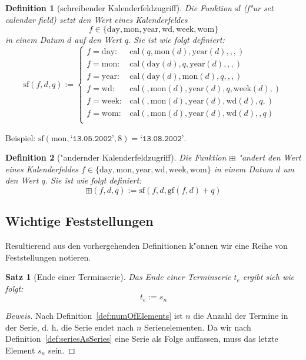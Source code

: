 \documentclass[a4paper]{article}
\newcommand*{\dayf}{\mathrm{day}}
\newcommand*{\monf}{\mathrm{mon}}
\newcommand*{\yearf}{\mathrm{year}}
\newcommand*{\wdf}{\mathrm{wd}}
\newcommand*{\weekf}{\mathrm{week}}
\newcommand*{\womf}{\mathrm{wom}}
\newcommand*{\calf}{\mathrm{cal}}
\newcommand*{\datev}[1]{\texttt{`#1'}}
\newcommand*{\gff}{\mathrm{gf}}
\newcommand*{\sff}{\mathrm{sf}}
\newcommand*{\addff}{\boxplus}
\numberwithin{equation}{section}
\newtheorem{dfn}{Definition}
\newtheorem{thm}{Satz}
\begin{document}
\begin{dfn}[schreibender Kalenderfeldzugriff]
  Die Funktion $\sff$ (f"ur \emph{set calendar field}) setzt den Wert eines
  Kalenderfeldes
  \begin{equation*}
    f \in \{\dayf, \monf, \yearf, \wdf, \weekf, \womf\}
  \end{equation*}
  in einem Datum $d$ auf den Wert $q$. Sie ist wie folgt definiert:
  \begin{equation}
    \sff(f, d, q) := \left\{\begin{array}{ll}
    f = \dayf : & \calf(q, \monf(d), \yearf(d), , , ) \\
    f = \monf : & \calf(\dayf(d), q, \yearf(d), , , ) \\
    f = \yearf : & \calf(\dayf(d), \monf(d), q, , ,) \\
    f = \wdf : & \calf(, \monf(d), \yearf(d), q, \weekf(d), ) \\
    f = \weekf : & \calf(, \monf(d), \yearf(d), \wdf(d), q, ) \\
    f = \womf : & \calf(, \monf(d), \yearf(d), \wdf(d), , q) \\
    \end{array}\right.
  \end{equation}
\end{dfn}
\noindent Beispiel: $\sff(\monf, \datev{13.05.2002}, 8) = \datev{13.08.2002}$.

\begin{dfn}["andernder Kalenderfeldzugriff]
  Die Funktion $\addff$ "andert den Wert eines Kalenderfeldes $f \in \{\dayf,
  \monf, \yearf, \wdf, \weekf, \womf\}$ in einem Datum $d$ um den Wert $q$. Sie
  ist wie folgt definiert:
  \begin{equation}
    \addff(f, d, q) := \sff(f, d, \gff(f, d) + q)
  \end{equation}
\end{dfn}


%
%
\subsection{Wichtige Feststellungen}
Resultierend aus den vorhergehenden Definitionen k"onnen wir eine Reihe von
Feststellungen notieren.

\begin{thm}[Ende einer Terminserie]\label{thm:endOfSeries}
  Das Ende einer Terminserie $t_e$ ergibt sich wie folgt:
  \begin{equation}t_e := s_n\end{equation}
\end{thm}
\begin{proof}[Beweis]
  Nach Definition~\ref{def:numOfElements} ist $n$ die Anzahl der Termine in der
  Serie, d. h. die Serie endet nach $n$ Serienelementen. Da wir nach
  Definition~\ref{def:seriesAsSeries} eine Serie als Folge auf\mbox{}fassen,
  muss das letzte Element $s_n$ sein.
\end{proof}
\end{document}
